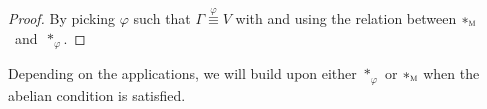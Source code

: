 \begin{proof} By picking $\varphi$ such that $\Gamma \overset{\varphi}{\equiv} V$ with  and using the relation between $\ast_{\operatorname{\textsc{m}}}$~and~$\ast_{\varphi}$.
\end{proof}

Depending on the applications, we will build upon either $\ast_{\varphi}$ or $\ast_{\operatorname{\textsc{m}}}$ when the abelian condition is satisfied.




